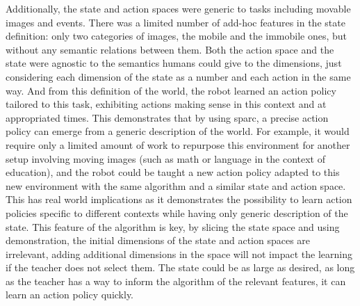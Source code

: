 Additionally, the state and action spaces were generic to tasks including movable images and events. There was a limited number of add-hoc features in the state definition: only two categories of images, the mobile and the immobile ones, but without any semantic relations between them. Both the action space and the state were agnostic to the semantics humans could give to the dimensions, just considering each dimension of the state as a number and each action in the same way. And from this definition of the world, the robot learned an action policy tailored to this task, exhibiting actions making sense in this context and at appropriated times. This demonstrates that by using \gls{sparc}, a precise action policy can emerge from a generic description of the world. For example, it would require only a limited amount of work to repurpose this environment for another setup involving moving images (such as math or language in the context of education), and the robot could be taught a new action policy adapted to this new environment with the same algorithm and a similar state and action space. This has real world implications as it demonstrates the possibility to learn action policies specific to different contexts while having only generic description of the state. This feature of the algorithm is key, by slicing the state space and using demonstration, the initial dimensions of the state and action spaces are irrelevant, adding additional dimensions in the space will not impact the learning if the teacher does not select them. The state could be as large as desired, as long as the teacher has a way to inform the algorithm of the relevant features, it can learn an action policy quickly.



